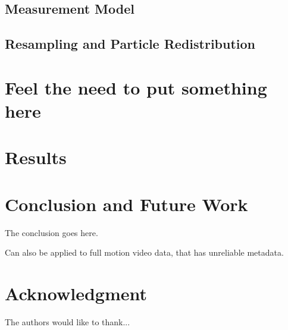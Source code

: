 \documentclass[conference]{IEEEtran}
\begin{document}
\subsection{Measurement Model}


\subsection{Resampling and Particle Redistribution}

\section{Feel the need to put something here}

\section{Results}

\section{Conclusion and Future Work}
The conclusion goes here.


Can also be applied to full motion video data, that has unreliable metadata.





\section*{Acknowledgment}


The authors would like to thank...







%
%
%



%




\end{document}
